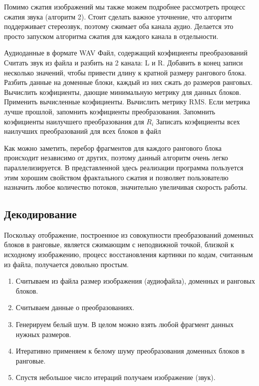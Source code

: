 \documentclass[bachelor,paper]{pmk-graduate}
\theoremstyle{definition}
\begin{document}
Помимо сжатия изображений мы также можем подробнее рассмотреть процесс сжатия звука (алгоритм 2). Стоит сделать важное уточнение, что алгоритм поддерживает стереозвук, поэтому сжимает оба канала аудио. Делается это просто запуском алгоритма сжатия для каждого канала в отдельности.
\begin{algorithm}
  \algrenewcommand{}
  \algrenewcommand{}
  \caption{Псевдокод основных этапов сжатия звука}\label{alg2}
  \begin{algorithmic}[1]
    \Require Аудиоданные в формате WAV
    \Ensure Файл, содержащий коэфициенты преобразований
    \State Считать звук из файла и разбить на 2 канала: L и R.
    \State Добавить в конец записи несколько значений, чтобы привести длину к кратной размеру рангового блока.
    \State Разбить данные на доменные блоки, каждый из них сжать до размеров ранговых.
        \State Вычислить коэфициенты, дающие минимальную метрику для данных блоков.
        \State Применить вычисленные коэфициенты.
        \State Вычислить метрику RMS.
        \State Если метрика лучше прошлой, запомнить коэфициенты преобразования.
      \EndFor
      \State Запомнить коэфициенты наилучшего преобразования для $R_i$
    \EndFor
    \State Записать коэфициенты всех наилучших преобразований для всех блоков в файл
  \end{algorithmic}
\end{algorithm}

Как можно заметить, перебор фрагментов для каждого рангового блока происходит независимо от других, поэтому данный алгоритм очень легко параллелизируется. В представленной здесь реализации программа пользуется этим хорошим свойством фрактального сжатия и позволяет пользователю назначить любое количество потоков, значительно увеличивая скорость работы.

\subsection{Декодирование}


Поскольку отображение, построенное из совокупности преобразований доменных блоков в ранговые, является сжимающим с неподвижной точкой, близкой к исходному изображению, процесс восстановления картинки по кодам, считанным из файла, получается довольно простым.
\begin{enumerate}
  \item Считываем из файла размер изображения (аудиофайла), доменных и ранговых блоков.
  \item Считываем данные о преобразованиях.
  \item Генерируем белый шум. В целом можно взять любой фрагмент данных нужных размеров.
  \item Итеративно применяем к белому шуму преобразования доменных блоков в ранговые.
  \item Спустя небольшое число итераций получаем изображение (звук).
\end{enumerate}
\end{document}
